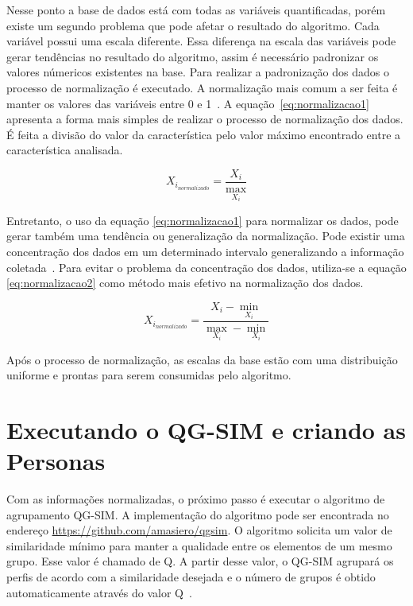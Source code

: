 Nesse ponto a base de dados está com todas as variáveis quantificadas, porém existe um segundo problema que pode afetar o resultado do algoritmo. Cada variável possui uma escala diferente. Essa diferença na escala das variáveis pode gerar tendências no resultado do algoritmo, assim é necessário padronizar os valores númericos existentes na base. Para realizar a padronização dos dados o processo de normalização é executado. A normalização mais comum a ser feita é manter os valores das variáveis entre 0 e 1~\cite{lattin:2011}. A equação~\ref{eq:normalizacao1} apresenta a forma mais simples de realizar o processo de normalização dos dados. É feita a divisão do valor da característica pelo valor máximo encontrado entre a característica analisada.

\begin{equation}
	X_{i_{normalizado}} = \frac{X_i}{\max_{X_i}}
	\label{eq:normalizacao1}
\end{equation}

Entretanto, o uso da equação \ref{eq:normalizacao1} para normalizar os dados, pode gerar também uma tendência ou generalização da normalização. Pode existir uma concentração dos dados em um determinado intervalo generalizando a informação coletada~\cite{masiero:2013}. Para evitar o problema da concentração dos dados, utiliza-se a equação \ref{eq:normalizacao2} como método mais efetivo na normalização dos dados.

\begin{equation}
	X_{i_{normalizado}} = \frac{X_i - \min_{X_i}}{\max_{X_i} - \min_{X_i}}
	\label{eq:normalizacao2}
\end{equation}

Após o processo de normalização, as escalas da base estão com uma distribuição uniforme e prontas para serem consumidas pelo algoritmo.

\section{Executando o QG-SIM e criando as Personas}
\label{sec:criarpersonas}
Com as informações normalizadas, o próximo passo é executar o algoritmo de agrupamento QG-SIM. A implementação do algoritmo pode ser encontrada no endereço \url{https://github.com/amasiero/qgsim}. O algoritmo solicita um valor de similaridade mínimo para manter a qualidade entre os elementos de um mesmo grupo. Esse valor é chamado de Q. A partir desse valor, o QG-SIM agrupará os perfis de acordo com a similaridade desejada e o número de grupos é obtido automaticamente através do valor Q~\cite{masiero:2013}.

